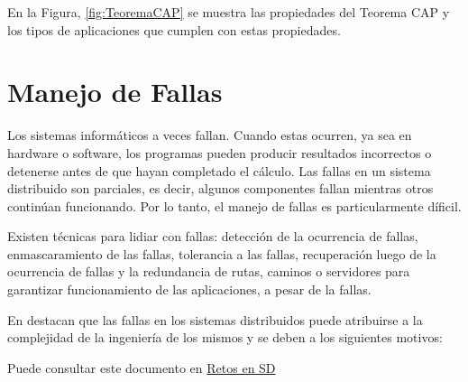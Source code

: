 En la Figura,  \ref{fig:TeoremaCAP} se muestra las propiedades del Teorema CAP y los tipos de aplicaciones que cumplen con estas propiedades.

	\section{Manejo de Fallas}  
Los sistemas informáticos a veces fallan. Cuando estas ocurren, ya sea en  hardware o software, los programas pueden producir resultados incorrectos o  detenerse antes de que hayan completado el cálculo.  Las fallas en un sistema distribuido son parciales, es decir, algunos componentes fallan mientras otros continúan funcionando. Por lo tanto, el manejo de fallas es particularmente díficil. 

 Existen técnicas  para lidiar con fallas: detección de la ocurrencia de fallas, enmascaramiento de las fallas, tolerancia a las  fallas, recuperación luego de la ocurrencia de fallas y la redundancia de rutas, caminos o servidores para garantizar funcionamiento de las aplicaciones, a pesar de la fallas. 

En \cite{Gabrielson2019}  
destacan que las fallas en los sistemas distribuidos puede atribuirse a  la complejidad de la ingeniería de los mismos   y se deben a los siguientes motivos: 
	
\begin{tcolorbox}
	[colback=red!5!white,colframe=red!75!black,fonttitle=\bfseries,title=Retos en Sistemas Distribuidos ]
	Puede consultar este documento en \href{https://aws.amazon.com/es/builders-library/
		challenges-with-distributed-systems/} {Retos en SD}
\end{tcolorbox}

